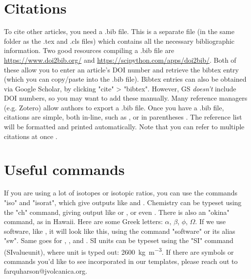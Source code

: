 \documentclass[draft, {\secondLanguage}, english]{volcanica-template}
\begin{document}
\section{Citations}
To cite other articles, you need a .bib file. This is a separate file (in the same folder as the .tex and .cls files) which contains all the necessary bibliographic information. Two good resources compiling a .bib file are \url{https://www.doi2bib.org/} and \url{https://scipython.com/apps/doi2bib/}. Both of these allow you to enter an article's DOI number and retrieve the bibtex entry (which you can copy/paste into the .bib file). Bibtex entries can also be obtained via Google Scholar, by clicking "cite" > "bibtex". However, GS \emph{doesn't} include DOI numbers, so you may want to add these manually. Many reference managers (e.g. Zotero) allow authors to export a .bib file. Once you have a .bib file, citations are simple, both in-line, such as \textcite{Farquharson2018}, or in parentheses \parencite{Kavanagh2022}. The reference list will be formatted and printed automatically. Note that you can refer to multiple citations at once \parencite[e.g.][among others]{Kavanagh2022, Siebert2015}.

\section{Useful commands}

If you are using a lot of isotopes or isotopic ratios, you can use the commands "iso" and "isorat", which give outputs like  and . Chemistry can be typeset using the "ch" command, giving output like  or \ch{[AgCl2]-}, or even . There is also an "okina" command, as in Hawai{\okina}i. Here are some Greek letters: $\alpha$, $\beta$, $\phi$, $\Omega$. If we use software, like , it will look like this, using the command "software" or its alias "sw". Same goes for , , and . SI units can be typeset using the "SI" command (SI{value}{unit}), where  unit is typed out: \SI{2600}{\kilo\gram\per\meter\cubed}. If there are symbols or commands you'd like to see incorporated in our templates, please reach out to farquharson@jvolcanica.org.

%
%
%
\EndMatter
\end{document}
